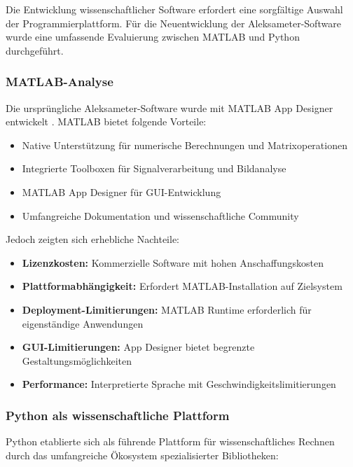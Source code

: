 Die Entwicklung wissenschaftlicher Software erfordert eine sorgfältige Auswahl der Programmierplattform. Für die Neuentwicklung der Aleksameter-Software wurde eine umfassende Evaluierung zwischen MATLAB und Python durchgeführt.

\subsubsection{MATLAB-Analyse}

Die ursprüngliche Aleksameter-Software wurde mit MATLAB App Designer entwickelt \parencite{Matlab}. MATLAB bietet folgende Vorteile:

\begin{itemize}
    \item Native Unterstützung für numerische Berechnungen und Matrixoperationen
    \item Integrierte Toolboxen für Signalverarbeitung und Bildanalyse
    \item MATLAB App Designer für GUI-Entwicklung
    \item Umfangreiche Dokumentation und wissenschaftliche Community
\end{itemize}

Jedoch zeigten sich erhebliche Nachteile:

\begin{itemize}
    \item \textbf{Lizenzkosten:} Kommerzielle Software mit hohen Anschaffungskosten
    \item \textbf{Plattformabhängigkeit:} Erfordert MATLAB-Installation auf Zielsystem
    \item \textbf{Deployment-Limitierungen:} MATLAB Runtime erforderlich für eigenständige Anwendungen
    \item \textbf{GUI-Limitierungen:} App Designer bietet begrenzte Gestaltungsmöglichkeiten
    \item \textbf{Performance:} Interpretierte Sprache mit Geschwindigkeitslimitierungen
\end{itemize}

\subsubsection{Python als wissenschaftliche Plattform}

Python \parencite{Python} etablierte sich als führende Plattform für wissenschaftliches Rechnen durch das umfangreiche Ökosystem spezialisierter Bibliotheken:

